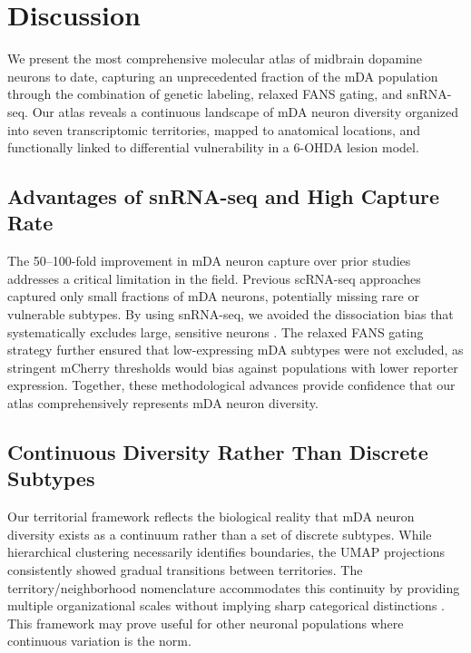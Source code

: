 \documentclass[12pt]{article}
\begin{document}
\section{Discussion}

We present the most comprehensive molecular atlas of midbrain dopamine neurons to date, capturing an unprecedented fraction of the mDA population through the combination of genetic labeling, relaxed FANS gating, and snRNA-seq. Our atlas reveals a continuous landscape of mDA neuron diversity organized into seven transcriptomic territories, mapped to anatomical locations, and functionally linked to differential vulnerability in a 6-OHDA lesion model.

\subsection{Advantages of snRNA-seq and High Capture Rate}

The 50--100-fold improvement in mDA neuron capture over prior studies \citep{poulin2014defining, lamanna2019single} addresses a critical limitation in the field. Previous scRNA-seq approaches captured only small fractions of mDA neurons, potentially missing rare or vulnerable subtypes. By using snRNA-seq, we avoided the dissociation bias that systematically excludes large, sensitive neurons \citep{bakken2018single}. The relaxed FANS gating strategy further ensured that low-expressing mDA subtypes were not excluded, as stringent mCherry thresholds would bias against populations with lower reporter expression. Together, these methodological advances provide confidence that our atlas comprehensively represents mDA neuron diversity.

\subsection{Continuous Diversity Rather Than Discrete Subtypes}

Our territorial framework reflects the biological reality that mDA neuron diversity exists as a continuum rather than a set of discrete subtypes. While hierarchical clustering necessarily identifies boundaries, the UMAP projections consistently showed gradual transitions between territories. The territory/neighborhood nomenclature accommodates this continuity by providing multiple organizational scales without implying sharp categorical distinctions \citep{saunders2018molecular, zeng2017neuronal}. This framework may prove useful for other neuronal populations where continuous variation is the norm.
\end{document}
